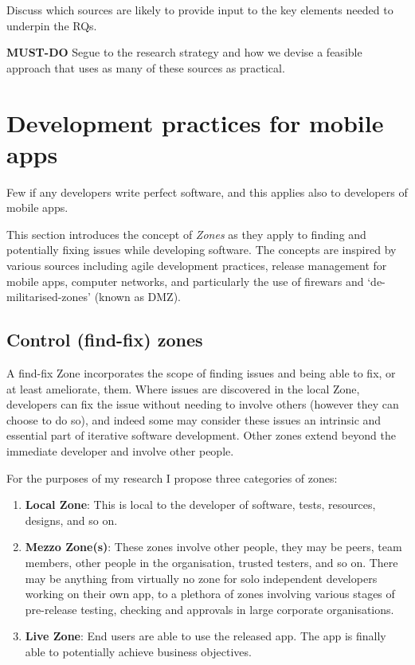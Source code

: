Discuss which sources are likely to provide input to the key elements needed to underpin the RQs.

\textbf{MUST-DO} Segue to the research strategy and how we devise a feasible approach that uses as many of these sources as practical.



\section{Development practices for mobile apps}
Few if any developers write perfect software, and this applies also to developers of mobile apps. 


This section introduces the concept of \textit{Zones} as they apply to finding and potentially fixing issues while developing software. The concepts are inspired by various sources including agile development practices, release management for mobile apps, computer networks, and particularly the use of firewars and `de-militarised-zones' (known as DMZ). 

\subsection{Control (find-fix) zones}
A find-fix Zone incorporates the scope of finding issues and being able to fix, or at least ameliorate, them. Where issues are discovered in the local Zone, developers can fix the issue without needing to involve others (however they can choose to do so), and indeed some may consider these issues an intrinsic and essential part of iterative software development. Other zones extend beyond the immediate developer and involve other people.

For the purposes of my research I propose three categories of zones:
\begin{enumerate}
    \item \textbf{Local Zone}: This is local to the developer of software, tests, resources, designs, and so on.
    \item \textbf{Mezzo Zone(s)}: These zones involve other people, they may be peers, team members, other people in the organisation, trusted testers, and so on. There may be anything from virtually no zone for solo independent developers working on their own app, to a plethora of zones involving various stages of pre-release testing, checking and approvals in large corporate organisations.
    \item \textbf{Live Zone}: End users are able to use the released app. The app is finally able to potentially achieve business objectives. 
\end{enumerate}



